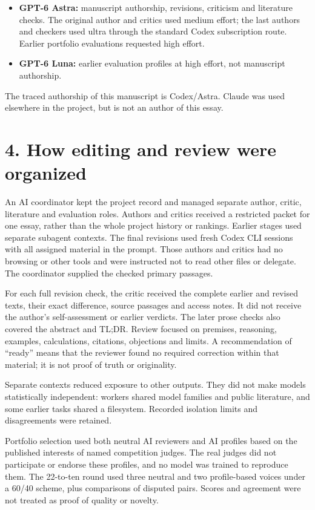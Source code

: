 \begin{itemize}
\item \textbf{GPT-6 Astra:} manuscript authorship, revisions, criticism and literature checks. The original author and critics used medium effort; the last authors and checkers used ultra through the standard Codex subscription route. Earlier portfolio evaluations requested high effort.
\item \textbf{GPT-6 Luna:} earlier evaluation profiles at high effort, not manuscript authorship.
\end{itemize}

The traced authorship of this manuscript is Codex/Astra. Claude was used elsewhere in the project, but is not an author of this essay.

\section*{4. How editing and review were organized}

An AI coordinator kept the project record and managed separate author, critic, literature and evaluation roles. Authors and critics received a restricted packet for one essay, rather than the whole project history or rankings. Earlier stages used separate subagent contexts. The final revisions used fresh Codex CLI sessions with all assigned material in the prompt. Those authors and critics had no browsing or other tools and were instructed not to read other files or delegate. The coordinator supplied the checked primary passages.

For each full revision check, the critic received the complete earlier and revised texts, their exact difference, source passages and access notes. It did not receive the author's self-assessment or earlier verdicts. The later prose checks also covered the abstract and TL;DR. Review focused on premises, reasoning, examples, calculations, citations, objections and limits. A recommendation of “ready” means that the reviewer found no required correction within that material; it is not proof of truth or originality.

Separate contexts reduced exposure to other outputs. They did not make models statistically independent: workers shared model families and public literature, and some earlier tasks shared a filesystem. Recorded isolation limits and disagreements were retained.

Portfolio selection used both neutral AI reviewers and AI profiles based on the published interests of named competition judges. The real judges did not participate or endorse these profiles, and no model was trained to reproduce them. The 22-to-ten round used three neutral and two profile-based voices under a 60/40 scheme, plus comparisons of disputed pairs. Scores and agreement were not treated as proof of quality or novelty.

